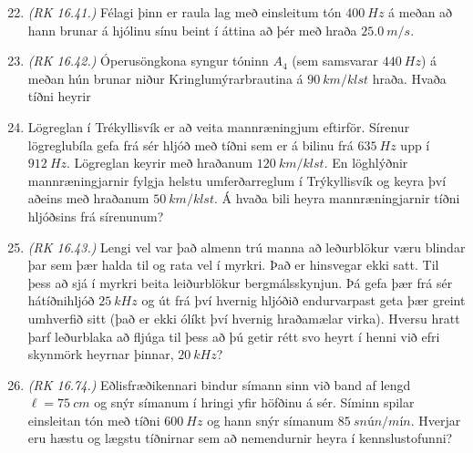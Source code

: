 \ifdefined \wholebook \else\documentclass[oneside]{book}\usepackage{EdlBook}\graphicspath{{figures/}}
\begin{document}
\vspace{-0.2cm}
\begin{enumerate}[label = \textbf{Dæmi \thechapter.\arabic*.}]
\setcounter{enumi}{21}
\item \textit{(RK 16.41.)} Félagi þinn er raula lag með einsleitum tón $\SI{400}{Hz}$ á meðan að hann brunar á hjólinu sínu beint í áttina að þér með hraða $\SI{25.0}{m/s}$. 

\item \textit{(RK 16.42.)} Óperusöngkona syngur tóninn $A_4$ (sem samsvarar $\SI{440}{Hz}$) á meðan hún brunar niður Kringlumýrarbrautina á $\SI{90}{km/klst}$ hraða. Hvaða tíðni heyrir 

\item Lögreglan í Trékyllisvík er að veita mannræningjum eftirför. Sírenur lögreglubíla gefa frá sér hljóð með tíðni sem er á bilinu frá $\SI{635}{Hz}$ upp í $\SI{912}{Hz}$. Lögreglan keyrir með hraðanum $\SI{120}{km/klst}$. En löghlýðnir mannræningjarnir fylgja helstu umferðarreglum í Trýkyllisvík og keyra því aðeins með hraðanum $\SI{50}{km/klst}$. Á hvaða bili heyra mannræningjarnir tíðni hljóðsins frá sírenunum?

\item \textit{(RK 16.43.)} Lengi vel var það almenn trú manna að leðurblökur væru blindar þar sem þær halda til og rata vel í myrkri. Það er hinsvegar ekki satt. Til þess að sjá í myrkri beita leiðurblökur bergmálsskynjun. Þá gefa þær frá sér hátíðnihljóð $\SI{25}{kHz}$ og út frá því hvernig hljóðið endurvarpast geta þær greint umhverfið sitt (það er ekki ólíkt því hvernig hraðamælar virka). Hversu hratt þarf leðurblaka að fljúga til þess að þú getir rétt svo heyrt í henni við efri skynmörk heyrnar þinnar, $\SI{20}{kHz}$?

\item \textit{(RK 16.74.)} Eðlisfræðikennari bindur símann sinn við band af lengd $\ell = \SI{75}{cm}$ og snýr símanum í hringi yfir höfðinu á sér. Síminn spilar einsleitan tón með tíðni $\SI{600}{Hz}$ og hann snýr símanum $\SI{85}{snún/mín}$. Hverjar eru hæstu og lægstu tíðnirnar sem að nemendurnir heyra í kennslustofunni?


\end{enumerate}
\end{document}
